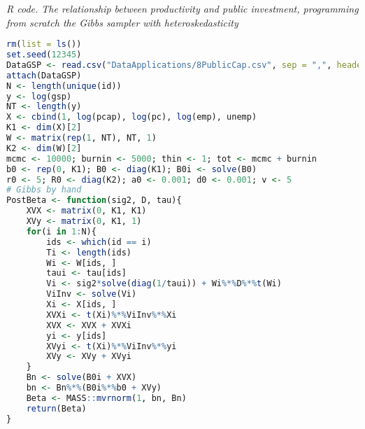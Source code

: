 \begin{enumerate}[leftmargin=*]
\begin{tcolorbox}[enhanced,width=4.67in,center upper,
	fontupper=\large\bfseries,drop shadow southwest,sharp corners]
	\textit{R code. The relationship between productivity and public investment, programming from scratch the Gibbs sampler with heteroskedasticity}
	\begin{VF}
		\begin{lstlisting}[language=R]
rm(list = ls())
set.seed(12345)
DataGSP <- read.csv("DataApplications/8PublicCap.csv", sep = ",", header = TRUE, fileEncoding = "latin1")
attach(DataGSP)
N <- length(unique(id))
y <- log(gsp)
NT <- length(y)
X <- cbind(1, log(pcap), log(pc), log(emp), unemp)
K1 <- dim(X)[2]
W <- matrix(rep(1, NT), NT, 1)
K2 <- dim(W)[2]
mcmc <- 10000; burnin <- 5000; thin <- 1; tot <- mcmc + burnin
b0 <- rep(0, K1); B0 <- diag(K1); B0i <- solve(B0) 
r0 <- 5; R0 <- diag(K2); a0 <- 0.001; d0 <- 0.001; v <- 5
# Gibbs by hand
PostBeta <- function(sig2, D, tau){
	XVX <- matrix(0, K1, K1)
	XVy <- matrix(0, K1, 1)
	for(i in 1:N){
		ids <- which(id == i)
		Ti <- length(ids)
		Wi <- W[ids, ]
		taui <- tau[ids]
		Vi <- sig2*solve(diag(1/taui)) + Wi%*%D%*%t(Wi)
		ViInv <- solve(Vi)
		Xi <- X[ids, ]
		XVXi <- t(Xi)%*%ViInv%*%Xi
		XVX <- XVX + XVXi
		yi <- y[ids]
		XVyi <- t(Xi)%*%ViInv%*%yi
		XVy <- XVy + XVyi
	}
	Bn <- solve(B0i + XVX)
	bn <- Bn%*%(B0i%*%b0 + XVy)
	Beta <- MASS::mvrnorm(1, bn, Bn)
	return(Beta)
}
\end{lstlisting}
	\end{VF}
\end{tcolorbox}


\end{enumerate}
